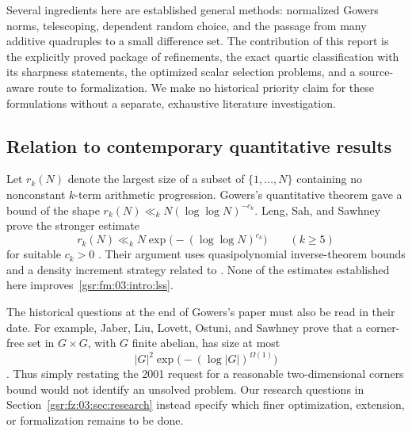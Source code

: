 \documentclass[11pt,letterpaper]{article}
\numberwithin{equation}{section}
\theoremstyle{definition}
\theoremstyle{remark}
\newcommand{\1}{\mathbf 1}
\begin{document}
Several ingredients here are established general methods: normalized
Gowers norms, telescoping, dependent random choice, and the passage from
many additive quadruples to a small difference set. The contribution of
this report is the explicitly proved package of refinements, the exact
quartic classification with its sharpness statements, the optimized
scalar selection problems, and a source-aware route to formalization.
We make no historical priority claim for these formulations without a
separate, exhaustive literature investigation.

\subsection{Relation to contemporary quantitative results}

Let $r_k(N)$ denote the largest size of a subset of $\{1,\ldots,N\}$
containing no nonconstant $k$-term arithmetic progression. Gowers's
quantitative theorem gave a bound of the shape
$r_k(N)\ll_k N(\log\log N)^{-c_k}$.
Leng, Sah, and Sawhney prove the stronger estimate
\begin{equation}
 r_k(N)\ll_k N\exp\bigl(- (\log\log N)^{c_k}\bigr)
 \qquad(k\ge5)
 \label{gsr:fm:03:intro:lss}
\end{equation}
for suitable $c_k>0$ \cite{lssbounds}. Their argument uses
quasipolynomial inverse-theorem bounds \cite{lssinverse} and a
density increment strategy related to \cite{greentaoyet}.
None of the estimates established here improves~\eqref{gsr:fm:03:intro:lss}.

The historical questions at the end of Gowers's paper must also be read
in their date. For example, Jaber, Liu, Lovett, Ostuni, and Sawhney prove
that a corner-free set in $G\times G$, with $G$ finite abelian, has size
at most
\[
 |G|^2\exp\bigl(- (\log|G|)^{\Omega(1)}\bigr)
\]
\cite{jaber}. Thus simply restating the 2001 request for a reasonable
two-dimensional corners bound would not identify an unsolved problem.
Our research questions in Section~\ref{gsr:fz:03:sec:research} instead specify
which finer optimization, extension, or formalization remains to be done.
\end{document}
